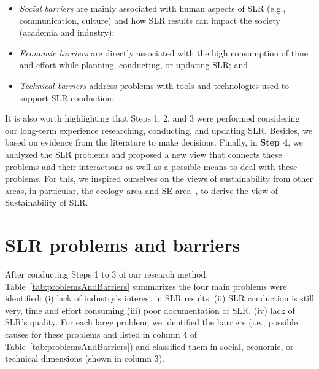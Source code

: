 \documentclass{article}
\begin{document}
\begin{itemize}[leftmargin=*]

\item \textit{Social barriers} are mainly associated with human aspects of SLR (e.g., communication, culture) and how SLR results can impact the society (academia and industry);

\item \textit{Economic barriers} are directly associated with the high consumption of time and effort while planning, conducting, or updating SLR; and

\item \textit{Technical barriers} address problems with tools and technologies used to support SLR conduction. 

\end{itemize}

It is also worth highlighting that Steps 1, 2, and 3 were performed considering our long-term experience researching, conducting, and updating SLR. Besides, we based on evidence from the literature to make decisions. Finally, in \textbf{Step 4}, we analyzed the SLR problems and proposed a new view that connects these problems and their interactions as well as a possible means to deal with these problems. For this, we inspired ourselves on the views of sustainability from other areas, in particular, the ecology area \cite{Brown1987Global} and SE area~\cite{Becker2015Sustainability}, to derive the view of Sustainability of SLR.



\section{SLR problems and barriers} \label{sec:results}

After conducting Steps 1 to 3 of our research method,  Table~\ref{tab:problemsAndBarriers} summarizes the four main problems were identified: (i) lack of industry's interest in SLR results, (ii) SLR conduction is still very, time and effort consuming (iii) poor documentation of SLR, (iv) lack of SLR's quality. For each large problem, we identified the barriers (i.e., possible causes for these problems and listed in column 4 of Table~\ref{tab:problemsAndBarriers}) and classified them in social, economic, or technical dimensions (shown in column 3). 
\end{document}
